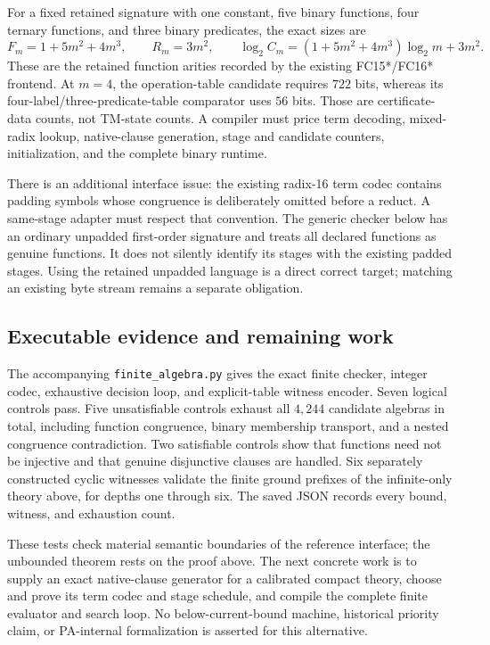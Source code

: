 For a fixed retained signature with one constant, five binary functions,
four ternary functions, and three binary predicates, the exact sizes are
\[
 F_m=1+5m^2+4m^3,\qquad R_m=3m^2,
 \qquad \log_2 C_m=(1+5m^2+4m^3)\log_2m+3m^2.
\]
These are the retained function arities recorded by the existing FC15*/FC16*
frontend.  At $m=4$, the operation-table candidate requires $722$ bits,
whereas its four-label/three-predicate-table comparator uses $56$ bits.
Those are certificate-data counts, not TM-state counts.  A compiler must
price term decoding, mixed-radix lookup, native-clause generation, stage and
candidate counters, initialization, and the complete binary runtime.

There is an additional interface issue: the existing radix-16 term codec
contains padding symbols whose congruence is deliberately omitted before a
reduct.  A same-stage adapter must respect that convention.  The generic
checker below has an ordinary unpadded first-order signature and treats all
declared functions as genuine functions.  It does not silently identify its
stages with the existing padded stages.  Using the retained unpadded language
is a direct correct target; matching an existing byte stream remains a
separate obligation.

\subsection{Executable evidence and remaining work}

The accompanying \texttt{finite\_algebra.py} gives the exact finite checker,
integer codec, exhaustive decision loop, and explicit-table witness encoder.
Seven logical controls pass.  Five unsatisfiable controls exhaust all $4{,}244$
candidate algebras in total, including function congruence, binary membership
transport, and a nested congruence contradiction.  Two satisfiable controls
show that functions need not be injective and that genuine disjunctive clauses
are handled.  Six separately constructed cyclic witnesses validate the
finite ground prefixes of the infinite-only theory above, for depths one
through six.  The saved JSON records every bound, witness, and exhaustion
count.

These tests check material semantic boundaries of the reference interface;
the unbounded theorem rests on the proof above.  The next concrete work is
to supply an exact native-clause generator for a calibrated compact theory,
choose and prove its term codec and stage schedule, and compile the complete
finite evaluator and search loop.  No below-current-bound machine, historical
priority claim, or PA-internal formalization is asserted for this alternative.
